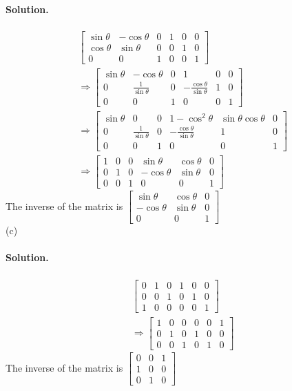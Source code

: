 \paragraph*{Solution.}
\begin{align*}
    &\left[\begin{array}{ccc|ccc}
        \sin\theta&-\cos\theta&0&1&0&0\\
        \cos\theta&\sin\theta&0&0&1&0\\
        0&0&1&0&0&1
    \end{array}\right]\\
    &\Rightarrow\left[\begin{array}{ccc|ccc}
        \sin\theta&-\cos\theta&0&1&0&0\\
        0&\frac{1}{\sin\theta}&0&-\frac{\cos\theta}{\sin\theta}&1&0\\
        0&0&1&0&0&1
    \end{array}\right]\\
    &\Rightarrow\left[\begin{array}{ccc|ccc}
        \sin\theta&0&0&1-\cos^2\theta&\sin\theta\cos\theta&0\\
        0&\frac{1}{\sin\theta}&0&-\frac{\cos\theta}{\sin\theta}&1&0\\
        0&0&1&0&0&1
    \end{array}\right]\\
    &\Rightarrow\left[\begin{array}{ccc|ccc}
        1&0&0&\sin\theta&\cos\theta&0\\
        0&1&0&-\cos\theta&\sin\theta&0\\
        0&0&1&0&0&1
    \end{array}\right]
\end{align*}
The inverse of the matrix is $\begin{bmatrix}
    \sin\theta&\cos\theta&0\\
    -\cos\theta&\sin\theta&0\\
    0&0&1
\end{bmatrix}$\\
(c)
\paragraph*{Solution.}
\begin{align*}
    &\left[\begin{array}{ccc|ccc}
        0&1&0&1&0&0\\0&0&1&0&1&0\\1&0&0&0&0&1
    \end{array}\right]\\
    &\Rightarrow\left[\begin{array}{ccc|ccc}
        1&0&0&0&0&1\\0&1&0&1&0&0\\0&0&1&0&1&0
    \end{array}\right]
\end{align*}
The inverse of the matrix is $\begin{bmatrix}
    0&0&1\\1&0&0\\0&1&0
\end{bmatrix}$\\

